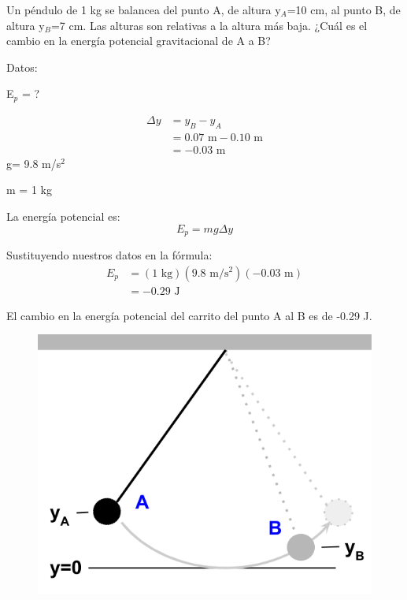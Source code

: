 \question[10] Un péndulo de 1 kg se balancea del punto A, de altura y$_A$=10 cm, al punto B, de altura y$_B$=7 cm. Las alturas son relativas a la altura más baja. ¿Cuál es el cambio en la energía potencial gravitacional de A a B?

\begin{minipage}{0.68\textwidth}
    \begin{solutionbox}{5.8cm}
        \begin{multicols}{2}
            Datos:

            E$_p$ = ?

            \[
                \begin{array}{rl}
                    \Delta y & = y_B - y_A                       \\
                             & = 0.07 \text{ m} - 0.10 \text{ m} \\
                             & = -0.03 \text{ m}
                \end{array}
            \]
            g= 9.8 m/s$^2$

            m = 1 kg

            \vspace{2cm}

            La energía potencial es:
            \[E_p=mg\Delta y\]


            Sustituyendo nuestros datos en la fórmula:
            \[
                \begin{array}{rl}
                    E_p & = (1 \text{ kg})(9.8 \text{ m/s$^2$})(-0.03 \text{ m}) \\[1em]
                        & =-0.29 \text{ J }
                \end{array}
            \]

        \end{multicols}
        \begin{center}El cambio en la energía potencial del carrito del punto A al B es de -0.29 J.\end{center}
    \end{solutionbox}
\end{minipage}\hfill
\begin{minipage}{0.25\textwidth}
    \begin{figure}[H]
        \includegraphics[width=\linewidth]{../images/4a243ab80f29a94e88f7c5425b2c9bfe54cd78a6}
    \end{figure}
\end{minipage}
